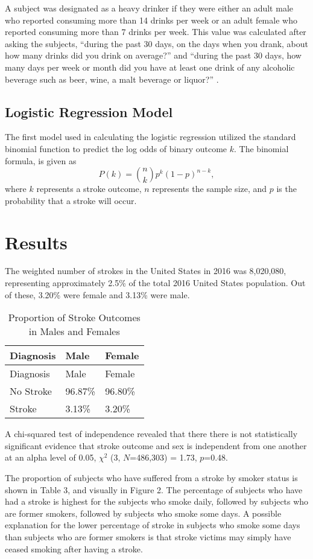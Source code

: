 \documentclass[11pt,]{article}
\begin{document}
A subject was designated as a heavy drinker if they were either an adult
male who reported consuming more than 14 drinks per week or an adult
female who reported consuming more than 7 drinks per week. This value
was calculated after asking the subjects, ``during the past 30 days, on
the days when you drank, about how many drinks did you drink on
average?'' and ``during the past 30 days, how many days per week or
month did you have at least one drink of any alcoholic beverage such as
beer, wine, a malt beverage or liquor?''
\citep{CentersforDiseaseControlandPrevention2007}.

\subsection{Logistic Regression Model}\label{logistic-regression-model}

The first model used in calculating the logistic regression utilized the
standard binomial function to predict the log odds of binary outcome
\(k\). The binomial formula, is given as
\[P(k)={n \choose k}p^{k}(1-p)^{n-k},\] where \(k\) represents a stroke
outcome, \(n\) represents the sample size, and \(p\) is the probability
that a stroke will occur.

\section{Results}\label{results}

The weighted number of strokes in the United States in 2016 was
8,020,080, representing approximately 2.5\% of the total 2016 United
States population. Out of these, 3.20\% were female and 3.13\% were
male.

\begin{longtable}[]{@{}lll@{}}
\caption{Proportion of Stroke Outcomes in Males and
Females}\tabularnewline
\toprule
Diagnosis & Male & Female\tabularnewline
\midrule
\endfirsthead
\toprule
Diagnosis & Male & Female\tabularnewline
\midrule
\endhead
No Stroke & 96.87\% & 96.80\%\tabularnewline
Stroke & 3.13\% & 3.20\%\tabularnewline
\bottomrule
\end{longtable}

A chi-squared test of independence revealed that there there is not
statistically significant evidence that stroke outcome and sex is
independent from one another at an alpha level of 0.05, \(\chi^2\) (3,
\(N\)=486,303) = 1.73, \(p\)=0.48.

The proportion of subjects who have suffered from a stroke by smoker
status is shown in Table 3, and visually in Figure 2. The percentage of
subjects who have had a stroke is highest for the subjects who smoke
daily, followed by subjects who are former smokers, followed by subjects
who smoke some days. A possible explanation for the lower percentage of
stroke in subjects who smoke some days than subjects who are former
smokers is that stroke victims may simply have ceased smoking after
having a stroke.
\end{document}

